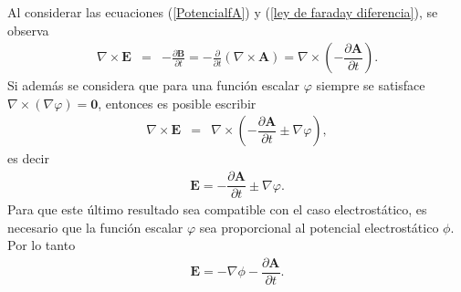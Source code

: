 \begin{obs}
Al considerar las ecuaciones  (\ref{PotencialfA}) y  (\ref{ley de faraday diferencia}), se observa
\begin{eqnarray}
\nabla\times\textbf{E}&=&-\frac{\partial\textbf{B}}{\partial t}=-\frac{\partial}{\partial t}(\nabla\times\textbf{A})=\nabla\times\left(-\dfrac{\partial \textbf{A}}{\partial t}\right).
\end{eqnarray}
Si adem\'as se considera que para una funci\'on escalar $\varphi$ siempre se satisface $\nabla\times (\nabla\varphi)=\mathbf{0}$, entonces
es posible escribir
\begin{eqnarray}
\nabla\times\textbf{E}&=&\nabla\times\left(-\dfrac{\partial \textbf{A}}{\partial t}\pm\nabla\varphi\right),
\end{eqnarray}
es decir
\begin{eqnarray*}
\textbf{E}=-\dfrac{\partial \textbf{A}}{\partial t}\pm\nabla\varphi.
\end{eqnarray*}
Para que este \'ultimo resultado sea compatible con el caso electrost\'atico, es necesario que la funci\'on escalar $\varphi$ sea proporcional al potencial electrost\'atico $\phi$. Por lo tanto
\begin{eqnarray}
\textbf{E}=-\nabla\phi-\dfrac{\partial \textbf{A}}{\partial t}.\label{EPhiA}
\end{eqnarray}
\end{obs}




